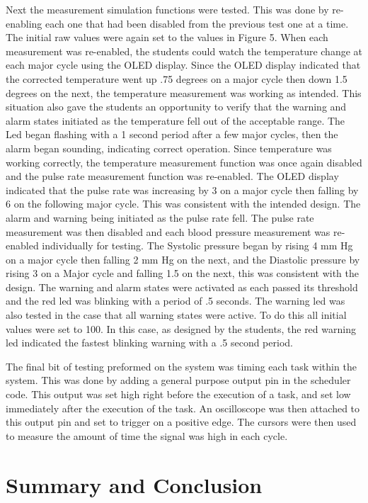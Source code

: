 \documentclass[12pt]{article} %
\begin{document}
Next the measurement simulation functions were tested. This was done by
re-enabling each one that had been disabled from the previous test one at a
time. The initial raw values were again set to the values in Figure 5. When
each measurement was re-enabled, the students could watch the temperature change
at each major cycle using the OLED display. Since the OLED display indicated
that the corrected temperature went up .75 degrees on a major cycle then down
1.5 degrees on the next, the temperature measurement was working as intended.
This situation also gave the students an opportunity to verify that the warning
and alarm states initiated as the temperature fell out of the acceptable range.
The Led began flashing with a 1 second period after a few major cycles, then
the alarm began sounding, indicating correct operation. Since temperature was
working correctly, the temperature measurement function was once again disabled
and the pulse rate measurement function was re-enabled. The OLED display
indicated that the pulse rate was increasing by 3 on a major cycle then falling
by 6 on the following major cycle. This was consistent with the intended
design. The alarm and warning being initiated as the pulse rate fell. The pulse
rate measurement was then disabled and each blood pressure measurement was
re-enabled individually for testing. The Systolic pressure began by rising 4 mm
Hg on a major cycle then falling 2 mm Hg on the next, and the Diastolic
pressure by rising 3 on a Major cycle and falling 1.5 on the next, this was
consistent with the design. The warning and alarm states were activated as each
passed its threshold and the red led was blinking with a period of .5 seconds.
The warning led was also tested in the case that all warning states were
active. To do this all initial values were set to 100. In this case, as
designed by the students, the red warning led indicated the fastest blinking
warning with a .5 second period. 

The final bit of testing preformed on the system was timing each task within
the system. This was done by adding a general purpose output pin in the
scheduler code. This output was set high right before the execution of a task,
and set low immediately after the execution of the task. An oscilloscope was
then attached to this output pin and set to trigger on a positive edge. The
cursors were then used to measure the amount of time the signal was high in
each cycle.

\section{Summary and Conclusion}
\end{document}

